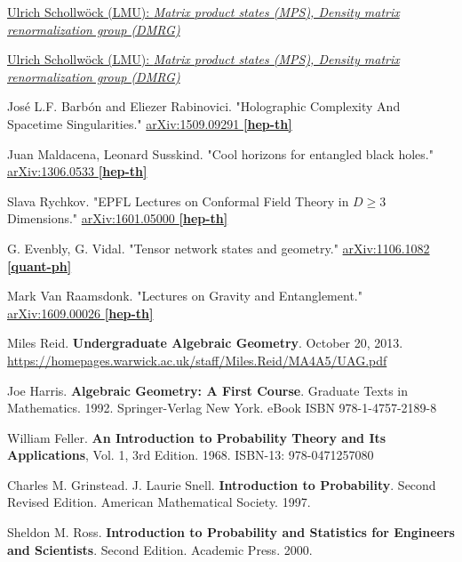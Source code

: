 \href{https://www.asc.physik.lmu.de/activities/schools/archiv/asc_school_17/extramaterial/schollwoeck_asc_1.pdf}{Ulrich Schollw\"{o}ck (LMU): \emph{Matrix product states (MPS), Density matrix renormalization group (DMRG)}}

\href{https://www.asc.physik.lmu.de/activities/schools/archiv/asc_school_17/extramaterial/schollwoeck_asc_2.pdf}{Ulrich Schollw\"{o}ck (LMU): \emph{Matrix product states (MPS), Density matrix renormalization group (DMRG)}}


Jos\'{e} L.F. Barb\'{o}n and Eliezer Rabinovici.  "Holographic Complexity And Spacetime Singularities."  \href{https://arxiv.org/abs/1509.09291v3}{arXiv:1509.09291 \textbf{[hep-th]}}

Juan Maldacena, Leonard Susskind.  "Cool horizons for entangled black holes."  \href{https://arxiv.org/abs/1306.0533}{ 	arXiv:1306.0533 \textbf{[hep-th]}}

Slava Rychkov.  "EPFL Lectures on Conformal Field Theory in $D \geq 3$ Dimensions."    \href{https://arxiv.org/abs/1601.05000}{arXiv:1601.05000 \textbf{[hep-th]}}

G. Evenbly, G. Vidal.  "Tensor network states and geometry."  \href{https://arxiv.org/abs/1106.1082}{arXiv:1106.1082 \textbf{[quant-ph]}}

Mark Van Raamsdonk.  "Lectures on Gravity and Entanglement."  \href{https://arxiv.org/abs/1609.00026}{arXiv:1609.00026 \textbf{[hep-th]}}


Miles Reid. \textbf{Undergraduate Algebraic Geometry}. October 20, 2013. \url{https://homepages.warwick.ac.uk/staff/Miles.Reid/MA4A5/UAG.pdf}

Joe Harris. \textbf{Algebraic Geometry: A First Course}. Graduate Texts in Mathematics. 1992. Springer-Verlag New York.   eBook ISBN 978-1-4757-2189-8
    







William Feller.  \textbf{An Introduction to Probability Theory and Its Applications}, Vol. 1, 3rd Edition.  1968.  ISBN-13: 978-0471257080

Charles M. Grinstead. J. Laurie Snell. \textbf{Introduction to Probability}. Second Revised Edition. American Mathematical Society. 1997.

Sheldon M. Ross. \textbf{Introduction to Probability and Statistics for Engineers and Scientists}. Second Edition. Academic Press. 2000.

